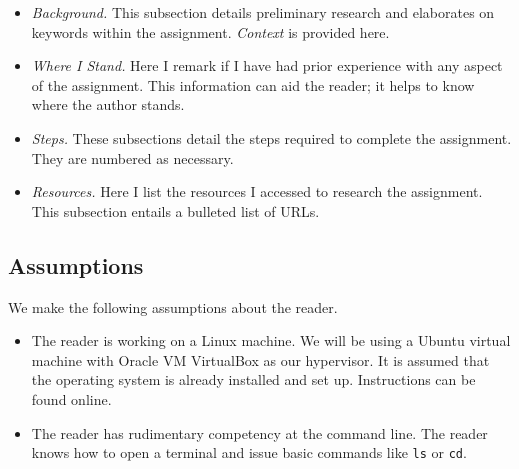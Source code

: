 \documentclass{article}
\begin{document}
\begin{itemize}

	\item

		\emph{Background.} This subsection details preliminary research
		and elaborates on keywords within the assignment. \emph{Context}
		is provided here.

	\item

		\emph{Where I Stand.} Here I remark if I have had prior
		experience with any aspect of the assignment. This information
		can aid the reader; it helps to know where the author stands.

	\item

		\emph{Steps.} These subsections detail the steps required to
		complete the assignment. They are numbered as necessary.

	\item

		\emph{Resources.} Here I list the resources I accessed to
		research the assignment. This subsection entails a bulleted list
		of URLs.

\end{itemize}


\subsection*{Assumptions}

We make the following assumptions about the reader.

\begin{itemize}

	\item

		The reader is working on a Linux machine.  We will be using a
		Ubuntu virtual machine with Oracle VM VirtualBox as our
		hypervisor. It is assumed that the operating system is already
		installed and set up. Instructions can be found online.

	\item

		The reader has rudimentary competency at the command line. The
		reader knows how to open a terminal and issue basic commands
		like \verb|ls| or \verb|cd|.

\end{itemize}
\end{document}
